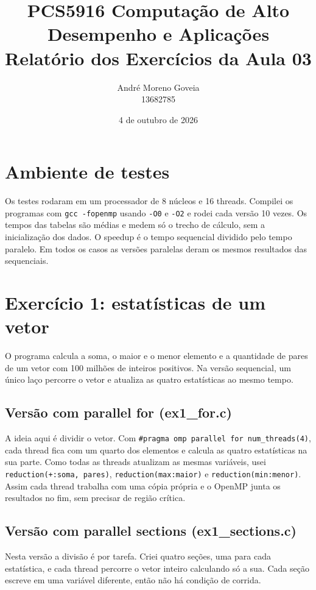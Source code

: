 \documentclass[11pt,a4paper]{article}
\title{PCS5916 Computação de Alto Desempenho e Aplicações\\[4pt]\large Relatório dos Exercícios da Aula 03}
\author{André Moreno Goveia\\13682785}
\date{4 de outubro de 2026}
\begin{document}
\sloppy
\maketitle

\section{Ambiente de testes}

Os testes rodaram em um processador de 8 núcleos e 16 threads. Compilei os programas com \texttt{gcc -fopenmp} usando \texttt{-O0} e \texttt{-O2} e rodei cada versão 10 vezes. Os tempos das tabelas são médias e medem só o trecho de cálculo, sem a inicialização dos dados. O speedup é o tempo sequencial dividido pelo tempo paralelo. Em todos os casos as versões paralelas deram os mesmos resultados das sequenciais.

\section{Exercício 1: estatísticas de um vetor}

O programa calcula a soma, o maior e o menor elemento e a quantidade de pares de um vetor com 100 milhões de inteiros positivos. Na versão sequencial, um único laço percorre o vetor e atualiza as quatro estatísticas ao mesmo tempo.

\subsection{Versão com parallel for (ex1\_for.c)}

A ideia aqui é dividir o vetor. Com \texttt{\#pragma omp parallel for num\_threads(4)}, cada thread fica com um quarto dos elementos e calcula as quatro estatísticas na sua parte. Como todas as threads atualizam as mesmas variáveis, usei \texttt{reduction(+:soma, pares)}, \texttt{reduction(max:maior)} e \texttt{reduction(min:menor)}. Assim cada thread trabalha com uma cópia própria e o OpenMP junta os resultados no fim, sem precisar de região crítica.

\subsection{Versão com parallel sections (ex1\_sections.c)}

Nesta versão a divisão é por tarefa. Criei quatro seções, uma para cada estatística, e cada thread percorre o vetor inteiro calculando só a sua. Cada seção escreve em uma variável diferente, então não há condição de corrida.
\end{document}
